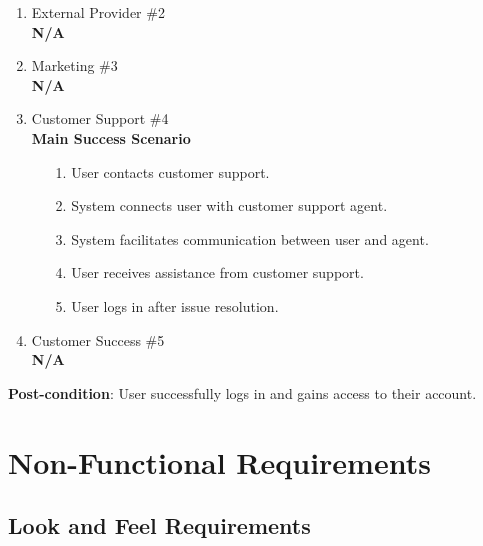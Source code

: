 \documentclass{article}
\begin{document}
\begin{enumerate}[{\bf BE1.}]
{\begin{enumerate}[{\bf VP1.}]
    \item External Provider \#2 \\
     \textbf{N/A}
        
 \item Marketing \#3 \\
	\textbf{N/A}

\item Customer Support \#4 \\

	\textbf{Main Success Scenario}
   
	\begin{enumerate}
		\item[1.] User contacts customer support.
		\item[2.] System connects user with customer support agent.
		\item[3.] System facilitates communication between user and agent.
		\item[4.] User receives assistance from customer support.
		\item[5.] User logs in after issue resolution. 
	\end{enumerate}
\item Customer Success \#5 \\
    \textbf{N/A}


\end{enumerate}

\textbf{Post-condition}: User successfully logs in and gains access to their account.
}
\end{enumerate}

\section{Non-Functional Requirements}
\label{sec:non-functional_requirements}

\subsection{Look and Feel Requirements}
\label{sub:look_and_feel_requirements}
\end{document}
